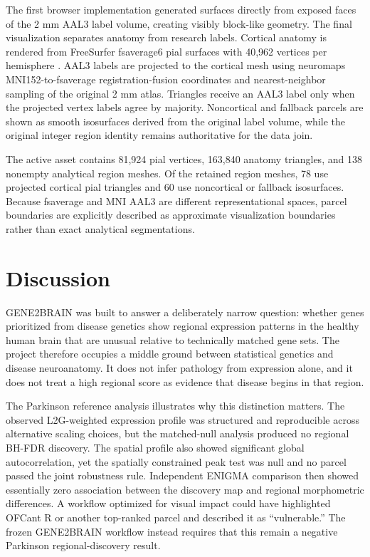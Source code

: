\documentclass[10pt,twocolumn]{article}
\begin{document}
The first browser implementation generated surfaces directly from exposed faces of the 2 mm AAL3 label volume, creating visibly block-like geometry. The final visualization separates anatomy from research labels. Cortical anatomy is rendered from FreeSurfer fsaverage6 pial surfaces with 40,962 vertices per hemisphere \cite{fischl2012freesurfer}. AAL3 labels \cite{rolls2020aal3} are projected to the cortical mesh using neuromaps MNI152-to-fsaverage registration-fusion coordinates \cite{markello2022neuromaps} and nearest-neighbor sampling of the original 2 mm atlas. Triangles receive an AAL3 label only when the projected vertex labels agree by majority. Noncortical and fallback parcels are shown as smooth isosurfaces derived from the original label volume, while the original integer region identity remains authoritative for the data join.

The active asset contains 81,924 pial vertices, 163,840 anatomy triangles, and 138 nonempty analytical region meshes. Of the retained region meshes, 78 use projected cortical pial triangles and 60 use noncortical or fallback isosurfaces. Because fsaverage and MNI AAL3 are different representational spaces, parcel boundaries are explicitly described as approximate visualization boundaries rather than exact analytical segmentations.

\section{Discussion}

GENE2BRAIN was built to answer a deliberately narrow question: whether genes prioritized from disease genetics show regional expression patterns in the healthy human brain that are unusual relative to technically matched gene sets. The project therefore occupies a middle ground between statistical genetics and disease neuroanatomy. It does not infer pathology from expression alone, and it does not treat a high regional score as evidence that disease begins in that region.

The Parkinson reference analysis illustrates why this distinction matters. The observed L2G-weighted expression profile was structured and reproducible across alternative scaling choices, but the matched-null analysis produced no regional BH-FDR discovery. The spatial profile also showed significant global autocorrelation, yet the spatially constrained peak test was null and no parcel passed the joint robustness rule. Independent ENIGMA comparison then showed essentially zero association between the discovery map and regional morphometric differences. A workflow optimized for visual impact could have highlighted OFCant R or another top-ranked parcel and described it as ``vulnerable.'' The frozen GENE2BRAIN workflow instead requires that this remain a negative Parkinson regional-discovery result.
\end{document}
